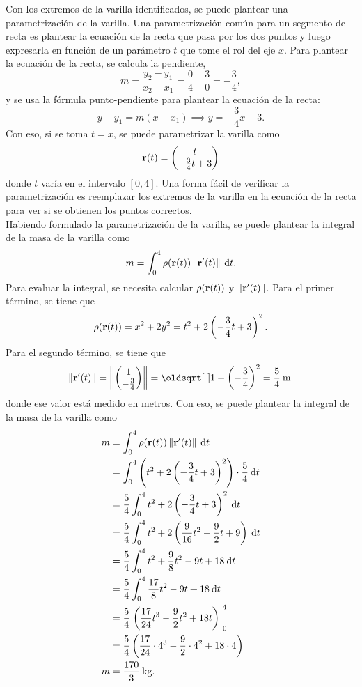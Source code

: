 \documentclass{fmbvecto}
\begin{document}
\begin{problema}
Con los extremos de la varilla identificados, se puede plantear una parametrización de la varilla. Una parametrización común para un segmento de recta es plantear la ecuación de la recta que pasa por los dos puntos y luego expresarla en función de un parámetro \(t\) que tome el rol del eje \(x\). Para plantear la ecuación de la recta, se calcula la pendiente,
\[m = \frac{y_2 - y_1}{x_2 - x_1} = \frac{0 - 3}{4 - 0} = -\frac{3}{4},\]
y se usa la fórmula punto-pendiente para plantear la ecuación de la recta:
\[y - y_1 = m(x - x_1) \implies y = -\frac{3}{4}x + 3.\]
Con eso, si se toma \(t = x\), se puede parametrizar la varilla como
\[\boldsymbol{{\mathbf{r}}}(t) = \begin{pmatrix}
    t \\
    -\frac{3}{4}t + 3
\end{pmatrix}\]
donde \(t\) varía en el intervalo \([0, 4]\). Una forma fácil de verificar la parametrización es reemplazar los extremos de la varilla en la ecuación de la recta para ver si se obtienen los puntos correctos.\\

Habiendo formulado la parametrización de la varilla, se puede plantear la integral de la masa de la varilla como
\[m = \int_{0}^{4} \rho(\boldsymbol{{\mathbf{r}}}(t)) \left\lVert \boldsymbol{{\mathbf{r}}}'(t) \right\rVert \: \mathrm{d}t.\]
Para evaluar la integral, se necesita calcular \(\rho(\boldsymbol{{\mathbf{r}}}(t))\) y \(\left\lVert \boldsymbol{{\mathbf{r}}}'(t) \right\rVert\). Para el primer término, se tiene que
\[\rho(\boldsymbol{{\mathbf{r}}}(t)) = x^2 + 2y^2 = t^2 + 2\left(-\frac{3}{4}t + 3\right)^2.\]
Para el segundo término, se tiene que
\[\norm{\bvec{r}'(t)} = \norm{\begin{pmatrix}
    1 \\
    -\frac{3}{4}
\end{pmatrix}} = \sqrt{1 + \left(-\frac{3}{4}\right)^2} = \frac{5}{4} \: \text{m}.\]
donde ese valor está medido en metros. Con eso, se puede plantear la integral de la masa de la varilla como
\begin{align*}
    m &= \int_{0}^{4} \rho(\boldsymbol{{\mathbf{r}}}(t)) \left\lVert \boldsymbol{{\mathbf{r}}}'(t) \right\rVert \: \mathrm{d}t \\
    &= \int_{0}^{4} \left(t^2 + 2\left(-\frac{3}{4}t + 3\right)^2\right) \cdot \frac{5}{4} \: \mathrm{d}t \\
    &= \frac{5}{4} \int_{0}^{4} t^2 + 2\left(-\frac{3}{4}t + 3\right)^2 \: \mathrm{d}t \\
    &= \frac{5}{4} \int_{0}^{4} t^2 + 2\left(\frac{9}{16}t^2 - \frac{9}{2}t + 9\right) \: \mathrm{d}t \\
    &= \frac{5}{4} \int_{0}^{4} t^2 + \frac{9}{8}t^2 - 9t + 18 \: \mathrm{d}t \\
    &= \frac{5}{4} \int_{0}^{4} \frac{17}{8}t^2 - 9t + 18 \: \mathrm{d}t \\
    &= \frac{5}{4} \left. \left(\frac{17}{24}t^3 - \frac{9}{2}t^2 + 18t\right) \right\vert_{0}^{4} \\
    &= \frac{5}{4} \left(\frac{17}{24} \cdot 4^3 - \frac{9}{2} \cdot 4^2 + 18 \cdot 4\right) \\
    m &= \frac{170}{3} \: \text{kg}.
\end{align*}


\end{problema}
\end{document}
